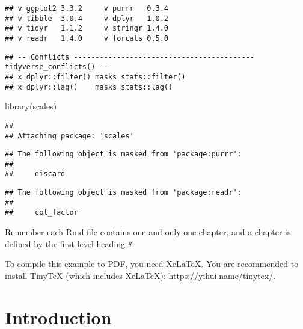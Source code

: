 \documentclass[
]{book}
\newenvironment{Shaded}{\begin{snugshade}}{\end{snugshade}}
\newcommand{\FunctionTok}[1]{\textcolor[rgb]{0.00,0.00,0.00}{#1}}
\newcommand{\NormalTok}[1]{#1}
\begin{document}
\begin{verbatim}
## v ggplot2 3.3.2     v purrr   0.3.4
## v tibble  3.0.4     v dplyr   1.0.2
## v tidyr   1.1.2     v stringr 1.4.0
## v readr   1.4.0     v forcats 0.5.0
\end{verbatim}

\begin{verbatim}
## -- Conflicts ------------------------------------------ tidyverse_conflicts() --
## x dplyr::filter() masks stats::filter()
## x dplyr::lag()    masks stats::lag()
\end{verbatim}

\begin{Shaded}
\begin{Highlighting}[]
\FunctionTok{library}\NormalTok{(scales)}
\end{Highlighting}
\end{Shaded}

\begin{verbatim}
## 
## Attaching package: 'scales'
\end{verbatim}

\begin{verbatim}
## The following object is masked from 'package:purrr':
## 
##     discard
\end{verbatim}

\begin{verbatim}
## The following object is masked from 'package:readr':
## 
##     col_factor
\end{verbatim}

Remember each Rmd file contains one and only one chapter, and a chapter is defined by the first-level heading \texttt{\#}.

To compile this example to PDF, you need XeLaTeX. You are recommended to install TinyTeX (which includes XeLaTeX): \url{https://yihui.name/tinytex/}.

\hypertarget{intro}{%
\chapter{Introduction}\label{intro}}
\end{document}
